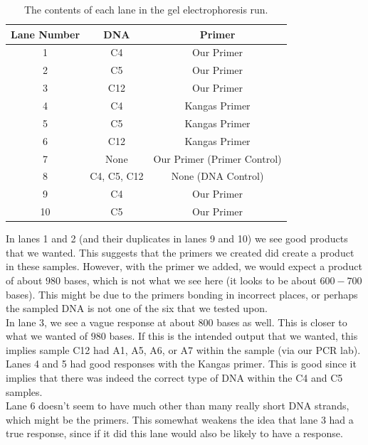 \documentclass[a4paper]{article}
\begin{document}
\begin{table}[h]
    \begin{center}
        \begin{tabular}{|c|c|c|}
            \hline 
            Lane Number & DNA & Primer\\
            \hline
            1 & C4 & Our Primer \\
            2 & C5 & Our Primer \\
            3 & C12 & Our Primer \\
            4 & C4 & Kangas Primer \\
            5 & C5 & Kangas Primer \\
            6 & C12 & Kangas Primer \\
            7 & None & Our Primer (Primer Control) \\
            8 & C4, C5, C12 & None (DNA Control) \\
            9 & C4 & Our Primer \\
            10 & C5 & Our Primer \\
            \hline
        \end{tabular}
    \end{center}
    \caption{The contents of each lane in the gel electrophoresis run.}
\end{table}

In lanes 1 and 2 (and their duplicates in lanes 9 and 10) we see good products that we wanted. This suggests that the primers we created did create a product in these samples. However, with the primer we added, we would expect a product of about $980$ bases, which is not what we see here (it looks to be about $600-700$ bases). This might be due to the primers bonding in incorrect places, or perhaps the sampled DNA is not one of the six that we tested upon.\\

In lane 3, we see a vague response at about $800$ bases as well. This is closer to what we wanted of $980$ bases. If this is the intended output that we wanted, this implies sample C12 had A1, A5, A6, or A7 within the sample (via our PCR lab).\\

Lanes 4 and 5 had good responses with the Kangas primer. This is good since it implies that there was indeed the correct type of DNA within the C4 and C5 samples.\\

Lane 6 doesn't seem to have much other than many really short DNA strands, which might be the primers. This somewhat weakens the idea that lane 3 had a true response, since if it did this lane would also be likely to have a response.\\
\end{document}
